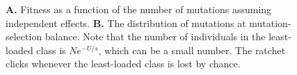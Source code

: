\documentclass[
  letterpaper,
]{book}
\begin{document}
\begin{figure}


\caption[Fitness as a function of the number of mutations assuming
independent effects \& The distribution of mutations at
mutation-selection balance]{\label{fig-6-1}\textbf{A.} Fitness as a
function of the number of mutations assuming independent effects.
\textbf{B.} The distribution of mutations at mutation-selection balance.
Note that the number of individuals in the least-loaded class is
\(Ne^{-U/s}\), which can be a small number. The ratchet clicks whenever
the least-loaded class is lost by chance.}

\end{figure}%
\end{document}
